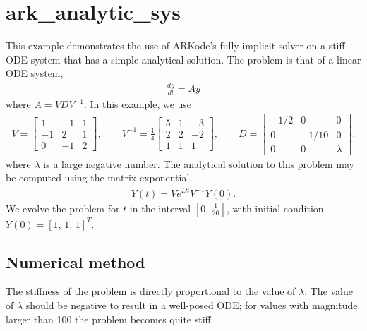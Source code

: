 \documentclass[letterpaper,10pt,english]{sphinxmanual}
\begin{document}
\section{ark\_analytic\_sys}
\label{\detokenize{cpp_serial:ark-analytic-sys}}\label{\detokenize{cpp_serial:id1}}
This example demonstrates the use of ARKode’s fully implicit solver on
a stiff ODE system that has a simple analytical solution.  The problem
is that of a linear ODE system,
\begin{equation*}
\begin{split}\frac{dy}{dt} = Ay\end{split}
\end{equation*}
where \(A = V D V^{-1}\).  In this example, we use
\begin{equation*}
\begin{split}V = \left[\begin{array}{rrr} 1 & -1 & 1\\ -1 & 2 & 1\\ 0 & -1 & 2
    \end{array}\right], \qquad
V^{-1} = \frac14 \left[\begin{array}{rrr} 5 & 1 & -3\\ 2 & 2 & -2\\
    1 & 1 & 1 \end{array}\right], \qquad
D = \left[\begin{array}{rrr} -1/2 & 0 & 0\\ 0 & -1/10 & 0\\ 0 & 0 &
    \lambda \end{array}\right].\end{split}
\end{equation*}
where \(\lambda\) is a large negative number. The analytical
solution to this problem may be computed using the matrix exponential,
\begin{equation*}
\begin{split}Y(t) = V e^{Dt} V^{-1} Y(0).\end{split}
\end{equation*}
We evolve the problem for \(t\) in the interval \(\left[0,\,
\frac{1}{20}\right]\), with initial condition \(Y(0) = \left[1,\,
1,\, 1\right]^T\).


\subsection{Numerical method}
\label{\detokenize{cpp_serial:numerical-method}}
The stiffness of the problem is directly proportional to the
value of \(\lambda\).  The value of \(\lambda\) should be
negative to result in a well-posed ODE; for values with magnitude
larger than 100 the problem becomes quite stiff.
\end{document}
